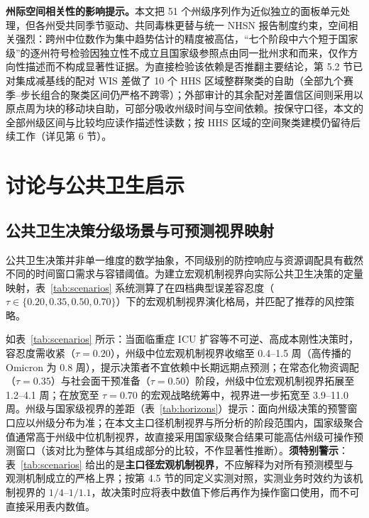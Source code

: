 \documentclass[10pt,a4paper]{article}
\theoremstyle{plain}
\theoremstyle{definition}
\begin{document}
\noindent\textbf{州际空间相关性的影响提示。}本文把 51 个州级序列作为近似独立的面板单元处理，但各州受共同季节驱动、共同毒株更替与统一 NHSN 报告制度约束，空间相关强烈：跨州中位数作为集中趋势估计的精度被高估，“七个阶段中六个短于国家级”的逐州符号检验因独立性不成立且国家级参照点由同一批州求和而来，仅作方向性描述而不构成显著性证据。为直接检验该依赖是否推翻主要结论，第 5.2 节已对集成减基线的配对 WIS 差做了 10 个 HHS 区域整群聚类的自助（全部九个赛季--步长组合的聚类区间仍严格不跨零）；外部审计的其余配对差置信区间则采用以原点周为块的移动块自助，可部分吸收州级时间与空间依赖。按保守口径，本文的全部州级区间与比较均应读作描述性读数；按 HHS 区域的空间聚类建模仍留待后续工作（详见第 6 节）。

\section{讨论与公共卫生启示}\label{sec:discussion}

\subsection{公共卫生决策分级场景与可预测视界映射}

公共卫生决策并非单一维度的数学抽象，不同级别的防控响应与资源调配具有截然不同的时间窗口需求与容错阈值。为建立宏观机制视界向实际公共卫生决策的定量映射，表~\ref{tab:scenarios} 系统测算了在四档典型误差容忍度（$\tau \in \{0.20, 0.35, 0.50, 0.70\}$）下的宏观机制视界演化格局，并匹配了推荐的风控策略。


如表~\ref{tab:scenarios} 所示：当面临重症 ICU 扩容等不可逆、高成本刚性决策时，容忍度需收紧（$\tau = 0.20$），州级中位宏观机制视界收缩至 0.4--1.5 周（高传播的 Omicron 为 0.8 周），提示决策者不宜依赖中长期远期点预测；在常态化物资调配（$\tau = 0.35$）与社会面干预准备（$\tau = 0.50$）阶段，州级中位宏观机制视界拓展至 1.2--4.1 周；在放宽至 $\tau = 0.70$ 的宏观战略统筹中，视界进一步拓宽至 3.9--11.0 周。州级与国家级视界的差距（表~\ref{tab:horizons}）提示：面向州级决策的预警窗口应以州级分布为准；在本文主口径机制视界与所分析的阶段范围内，国家级聚合值通常高于州级中位机制视界，故直接采用国家级聚合结果可能高估州级可操作预测窗口（该对比为整体与其组成部分的比较，不作显著性推断）。\textbf{须特别警示}：表~\ref{tab:scenarios} 给出的是\textbf{主口径宏观机制视界}，不应解释为对所有预测模型与观测机制成立的严格上界；按第 4.5 节的同定义实测对照，实测业务时效约为该机制视界的 $1/4$--$1/1.1$，故决策时应将表中数值下修后再作为操作窗口使用，而不可直接采用表内数值。
\end{document}
